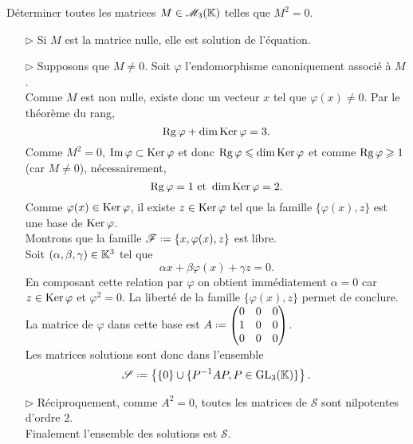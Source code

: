 \begin{exercice}
    Déterminer toutes les matrices $M \in \mathscr{M}_3(\mathbb{K})$ telles que $M^2=0$.
\end{exercice}

\begin{solution}
    \begin{itemize}
        \item[$\rhd$] Si $M$ est la matrice nulle, elle est solution de l'équation.
        \item[$\rhd$] Supposons que $M \not= 0$. Soit $\varphi$ l'endomorphisme canoniquement associé à $M$. \\
        Comme $M$ est non nulle, existe donc un vecteur $x$ tel que $\varphi(x) \not= 0$. Par le théorème du rang, 
        $$\mathrm{Rg}\, \varphi + \dim \mathrm{Ker}\, \varphi = 3.$$ 
        Comme $M^2 = 0$, $\Im \varphi \subset \mathrm{Ker}\, \varphi$ et donc $\mathrm{Rg}\, \varphi \leqslant \dim \mathrm{Ker}\, \varphi$ et comme $\mathrm{Rg}\, \varphi \geqslant 1$ (car $M \not=0$), nécessairement, 
        $$\mathrm{Rg}\, \varphi = 1 \text{ et } \dim \mathrm{Ker}\, \varphi = 2.$$
        Comme $\varphi(x) \in \mathrm{Ker}\, \varphi$, il existe $z \in \mathrm{Ker}\, \varphi$ tel que la famille $\{ \varphi(x), z \}$ est une base de $\mathrm{Ker}\, \varphi$. \\
        Montrons que la famille $\mathscr{F} \defeq \{x, \varphi(x), z \}$ est libre. \\
        Soit $(\alpha, \beta, \gamma) \in \mathbb{K}^3$ tel que 
        $$\alpha x + \beta \varphi(x) + \gamma z = 0.$$
        En composant cette relation par $\varphi$ on obtient immédiatement $\alpha = 0$ car $z \in \mathrm{Ker}\, \varphi$ et $\varphi^2 = 0$. La liberté de la famille $\{ \varphi(x), z \}$ permet de conclure. \\
        La matrice de $\varphi$ dans cette base est 
        $A \defeq
        \begin{pmatrix}
        0 & 0 & 0 \\
        1 & 0 & 0 \\ 
        0 & 0 & 0
        \end{pmatrix}
        $. \\
        Les matrices solutions sont donc dans l'ensemble
        $$\mathscr{S} \defeq \left \{ \{0\} \cup \{\Inv{P} A P, P \in \Gl_3(\K) \} \right \}.$$
        \item[$\rhd$] Réciproquement, comme $A^2 = 0$, toutes les matrices de $\mathscr{S}$ sont nilpotentes d'ordre $2$. \\
        Finalement l'ensemble des solutions est $\mathscr{S}$.
    \end{itemize}
\end{solution}
